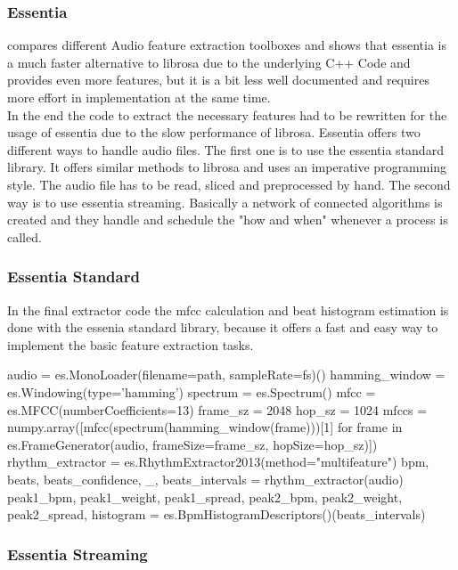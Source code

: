 \subsubsection{Essentia}

\cite{audiofeattoolb} compares different Audio feature extraction toolboxes and shows that essentia is a much faster alternative to librosa due to the underlying C++ Code and provides even more features, but it is a bit less well documented and requires more effort in implementation at the same time.\\ 
In the end the code to extract the necessary features had to be rewritten for the usage of essentia due to the slow performance of librosa. Essentia offers two different ways to handle audio files. The first one is to use the essentia standard library. It offers similar methods to librosa and uses an imperative programming style. The audio file has to be read, sliced and preprocessed by hand. 
The second way is to use essentia streaming. Basically a network of connected algorithms is created and they handle and schedule the "how and when" whenever a process is called.

\subsubsection{Essentia Standard}

In the final extractor code the mfcc calculation and beat histogram estimation is done with the essenia standard library, because it offers a fast and easy way to implement the basic feature extraction tasks. 
\begin{pythonCode}
audio = es.MonoLoader(filename=path, sampleRate=fs)()
hamming_window = es.Windowing(type='hamming')
spectrum = es.Spectrum()
mfcc = es.MFCC(numberCoefficients=13)
frame_sz = 2048
hop_sz = 1024
mfccs = numpy.array([mfcc(spectrum(hamming_window(frame)))[1] 
	for frame in es.FrameGenerator(audio, frameSize=frame_sz, hopSize=hop_sz)])
rhythm_extractor = es.RhythmExtractor2013(method="multifeature")
bpm, beats, beats_confidence, _, beats_intervals = rhythm_extractor(audio)
peak1_bpm, peak1_weight, peak1_spread, peak2_bpm, peak2_weight, peak2_spread, histogram =
	es.BpmHistogramDescriptors()(beats_intervals)
\end{pythonCode}

\subsubsection{Essentia Streaming}

